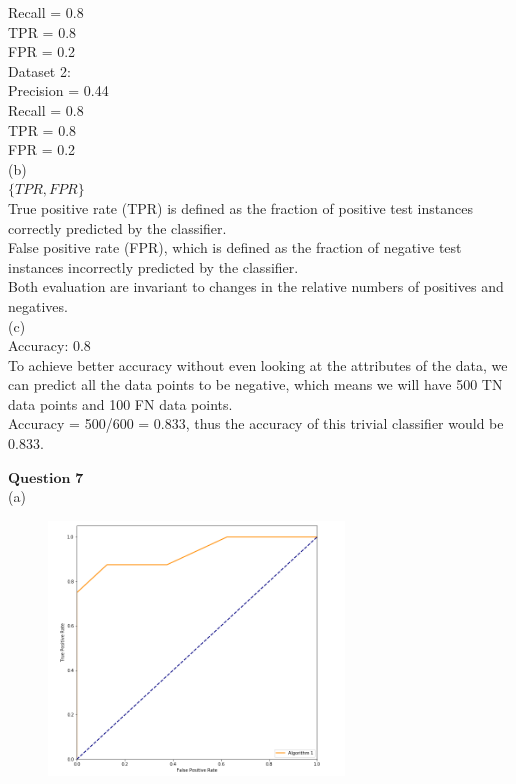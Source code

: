 \documentclass[12pt]{article}
\begin{document}
Recall = 0.8\\

TPR = 0.8\\

FPR = 0.2\\

Dataset 2:\\

Precision = 0.44\\

Recall = 0.8\\

TPR = 0.8\\

FPR = 0.2\\

(b)\\

$\{TPR,FPR\}$\\

True positive rate (TPR) is defined as the fraction of positive test instances correctly predicted by the classifier.\\

False positive rate (FPR), which is defined as the fraction of negative test instances incorrectly predicted by the classifier.\\

Both evaluation are invariant to changes in the relative numbers of positives and negatives.\\

(c)\\

Accuracy: 0.8\\

To achieve better accuracy without even looking at the attributes of the data, we can predict all the data points to be negative, which means we will have 500 TN data points and 100 FN data points.\\

Accuracy = 500/600 = 0.833, thus the accuracy of this trivial classifier would be 0.833.\\

\newpage

$\textbf{Question 7}$\\

(a)\\

\begin{figure}[H] 
\centering 
\includegraphics[width=0.7\textwidth]{algo1} 
\end{figure}
\end{document}
